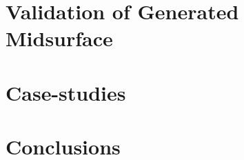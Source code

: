 \chapter{Validation of Generated Midsurface} \label{ch:Validation}





\chapter{Case-studies} \label{ch:Testing}


\chapter{Conclusions} \label{ch:Conclusions}



